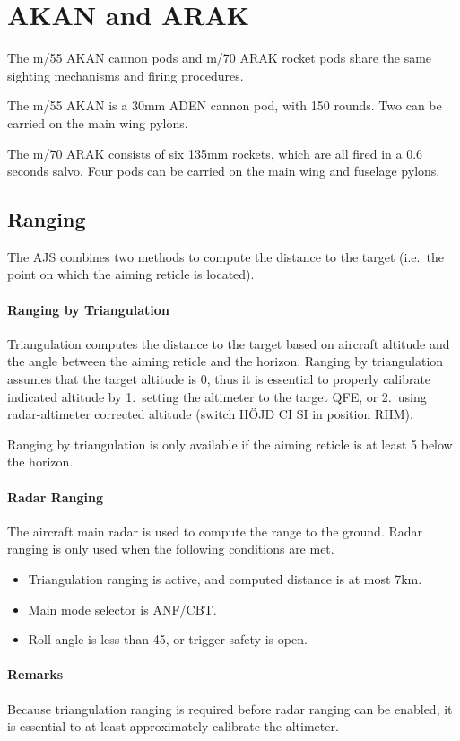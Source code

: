 \section{AKAN and ARAK}
The m/55 AKAN cannon pods and m/70 ARAK rocket pods share
the same sighting mechanisms and firing procedures.

The m/55 AKAN is a 30mm ADEN cannon pod, with 150 rounds.
Two can be carried on the main wing pylons.

The m/70 ARAK consists of six 135mm rockets, which are all fired in a 0.6 seconds salvo.
Four pods can be carried on the main wing and fuselage pylons.

\subsection{Ranging}
The AJS combines two methods to compute the distance to the target
(i.e.\ the point on which the aiming reticle is located).

\paragraph{Ranging by Triangulation}
Triangulation computes the distance to the target based on aircraft altitude
and the angle between the aiming reticle and the horizon.
Ranging by triangulation assumes that the target altitude is 0,
thus it is essential to properly calibrate indicated altitude by
1.\ setting the altimeter to the target QFE,
or 2.\ using radar-altimeter corrected altitude (switch HÖJD CI SI in position RHM).

Ranging by triangulation is only available if the aiming reticle is at
least 5\textdegree{} below the horizon.

\paragraph{Radar Ranging}
The aircraft main radar is used to compute the range to the ground.
Radar ranging is only used when the following conditions are met.
\begin{itemize}[nosep]
  \item Triangulation ranging is active, and computed distance is at most 7km.
  \item Main mode selector is ANF/CBT.
  \item Roll angle is less than 45\textdegree{}, or trigger safety is open.
\end{itemize}

\paragraph{Remarks}
Because triangulation ranging is required before radar ranging can be enabled,
it is essential to at least approximately calibrate the altimeter.

